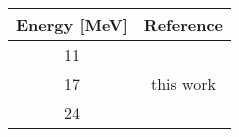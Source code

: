 \begin{tabular}{|c||c|} 
    \hline 
    \bf{Energy [MeV]} & \bf{Reference} \\
    \hline
    \hline 
    11 & \cite{Rapaport80}\\
    17 & this work\\
    24 & \cite{Rapaport80}\\
    \hline
\end{tabular}
